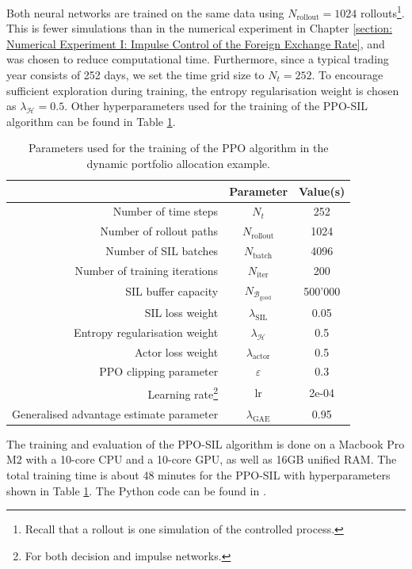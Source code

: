 Both neural networks are trained on the same data using $N_{\text{rollout}}=1024$ rollouts\footnote{Recall that a rollout is one simulation of the controlled process.}. This is fewer simulations than in the numerical experiment in Chapter \ref{section: Numerical Experiment I: Impulse Control of the Foreign Exchange Rate}, and was chosen to reduce computational time. Furthermore, since a typical trading year consists of 252 days, we set the time grid size to $N_t=252$. To encourage sufficient exploration during training, the entropy regularisation weight is chosen as $\lambda_\mathcal{H}=0.5$. Other hyperparameters used for the training of the PPO-SIL algorithm can be found in Table \ref{tab: PPO training parameters pfolio}.
\begin{table}[!htbp]
    \centering
    \begin{tabular}{rcc}
        \toprule
        & Parameter & Value(s) \\
        \hline
        Number of time steps & $N_t$ & 252 \\
        Number of rollout paths & $N_\text{rollout}$ & 1024 \\
        Number of SIL batches & $N_\text{batch}$ & 4096 \\
        Number of training iterations & $N_\text{iter}$ & 200 \\
        SIL buffer capacity & $N_{\mathcal{B}_\text{good}}$ & 500'000 \\
        SIL loss weight & $\lambda_{\text{SIL}}$ & 0.05 \\
        Entropy regularisation weight & $\lambda_{\mathcal{H}}$ & 0.5 \\
        Actor loss weight & $\lambda_{\text{actor}}$ & 0.5 \\
        PPO clipping parameter & $\varepsilon$ & 0.3 \\
        Learning rate\footnote{For both decision and impulse networks.} & lr & 2e-04 \\
        Generalised advantage estimate parameter & $\lambda_\text{GAE}$ & 0.95\\
        \toprule
    \end{tabular}
    \caption{Parameters used for the training of the PPO algorithm in the dynamic portfolio allocation example.}
    \label{tab: PPO training parameters pfolio}
\end{table}

The training and evaluation of the PPO-SIL algorithm is done on a Macbook Pro M2 with a 10-core CPU and a 10-core GPU, as well as 16GB unified RAM. The total training time is about 48 minutes for the PPO-SIL with hyperparameters shown in Table \ref{tab: PPO training parameters pfolio}. The Python code can be found in \cite{mycode}.

